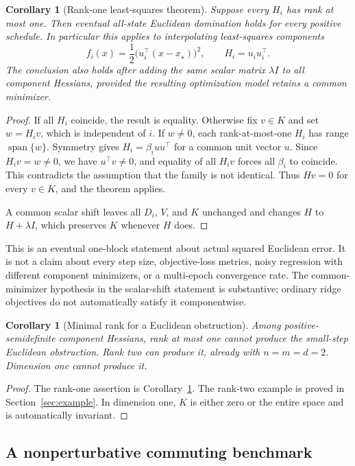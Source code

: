 \documentclass[11pt,letterpaper]{article}
\numberwithin{equation}{section}
\newtheorem{corollary}[theorem]{Corollary}
\theoremstyle{definition}
\begin{document}
\begin{corollary}[Rank-one least-squares theorem]\label{cor:rankone}
Suppose every $H_i$ has rank at most one. Then eventual all-state Euclidean domination holds for every positive schedule. In particular this applies to interpolating least-squares components
\[
 f_i(x)=\frac12\bigl(u_i^\top(x-x_\star)\bigr)^2,
 \qquad H_i=u_iu_i^\top.
\]
The conclusion also holds after adding the same scalar matrix $\lambda I$ to all component Hessians, provided the resulting optimization model retains a common minimizer.
\end{corollary}
\begin{proof}
If all $H_i$ coincide, the result is equality. Otherwise fix $v\in K$ and set $w=H_iv$, which is independent of $i$. If $w\ne0$, each rank-at-most-one $H_i$ has range $\operatorname{span}\{w\}$. Symmetry gives $H_i=\beta_i uu^\top$ for a common unit vector $u$. Since $H_iv=w\ne0$, we have $u^\top v\ne0$, and equality of all $H_iv$ forces all $\beta_i$ to coincide. This contradicts the assumption that the family is not identical. Thus $Hv=0$ for every $v\in K$, and the theorem applies.

A common scalar shift leaves all $D_i$, $V$, and $K$ unchanged and changes $H$ to $H+\lambda I$, which preserves $K$ whenever $H$ does.
\end{proof}

This is an eventual one-block statement about actual squared Euclidean error. It is not a claim about every step size, objective-loss metrics, noisy regression with different component minimizers, or a multi-epoch convergence rate. The common-minimizer hypothesis in the scalar-shift statement is substantive; ordinary ridge objectives do not automatically satisfy it componentwise.

\begin{corollary}[Minimal rank for a Euclidean obstruction]\label{cor:minimal}
Among positive-semidefinite component Hessians, rank at most one cannot produce the small-step Euclidean obstruction. Rank two can produce it, already with $n=m=d=2$. Dimension one cannot produce it.
\end{corollary}
\begin{proof}
The rank-one assertion is Corollary~\ref{cor:rankone}. The rank-two example is proved in Section~\ref{sec:example}. In dimension one, $K$ is either zero or the entire space and is automatically invariant.
\end{proof}

\subsection{A nonperturbative commuting benchmark}
\end{document}
